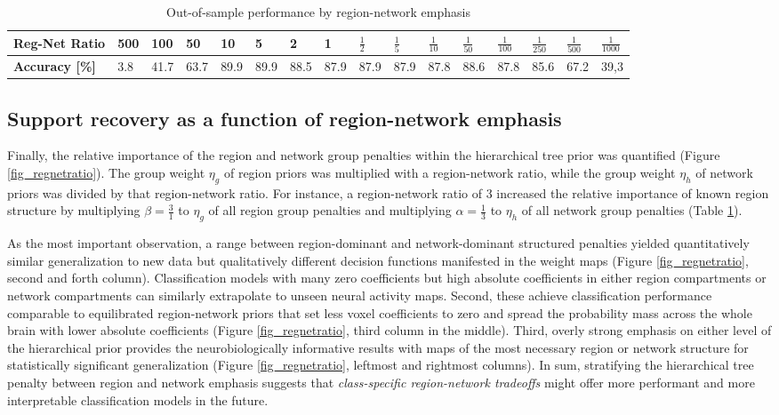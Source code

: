 \documentclass{article}
\begin{document}
%
\begin{table}[]
\centering
\caption{Out-of-sample performance by region-network emphasis}
\begin{tabular}{l|l|l|l|l|l|l|l|l|l|l|l|l|l|l|l}
\textbf{Reg-Net Ratio} & 500 & 100  & 50   & 10   & 5    & 2    & 1    & $\frac{1}{2}$  & $\frac{1}{5}$  & $\frac{1}{10}$ & $\frac{1}{50}$ & $\frac{1}{100}$ & $\frac{1}{250}$ & $\frac{1}{500}$ & $\frac{1}{1000}$ \\ \hline
\textbf{Accuracy {[}\%{]}}      & 3.8          & 41.7 & 63.7 & 89.9 & 89.9 & 88.5 & 87.9 & 87.9 & 87.9 & 87.8 & 88.6 & 87.8  & 85.6  & 67.2  & 39,3  
\end{tabular}
\label{table_reg_net_ratio}
\end{table}
%
\subsection{Support recovery as a function of region-network emphasis}
Finally, the relative importance of the
region and network group penalties within the hierarchical tree prior
was quantified (Figure \ref{fig_regnetratio}).
The group weight $\eta_g$ of region priors was multiplied with a
region-network ratio, while the
group weight $\eta_h$ of network priors was divided by that
region-network ratio. For instance, a region-network ratio of 3
increased the relative importance of known region structure
by multiplying $\beta = \frac{3}{1}$ to
$\eta_g$ of all region group penalties
and multiplying
$\alpha = \frac{1}{3}$ to $\eta_h$ of all network group penalties
(Table \ref{table_reg_net_ratio}).



As the most important observation,
a range between region-dominant and network-dominant structured penalties
yielded quantitatively similar generalization to new data
but qualitatively different decision functions manifested in the weight maps
(Figure \ref{fig_regnetratio}, second and forth column).
Classification models with many zero coefficients but high absolute
coefficients in either region compartments or network compartments
can similarly extrapolate to unseen neural activity maps.
Second,
these achieve classification performance
comparable to equilibrated region-network priors
that set less voxel coefficients to zero and spread the
probability mass across the whole brain
with lower absolute coefficients
(Figure \ref{fig_regnetratio}, third column in the middle).
Third,
overly strong emphasis on either level of the hierarchical prior
provides the neurobiologically informative results with maps
of the most necessary region or network structure for
statistically significant generalization
(Figure \ref{fig_regnetratio}, leftmost and rightmost columns).
%
In sum,
stratifying the hierarchical tree penalty between region and network emphasis
suggests that \textit{class-specific region-network tradeoffs}
might offer more performant and more interpretable classification models
in the future.
\end{document}
